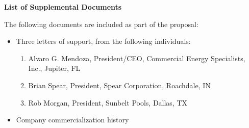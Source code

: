 \documentclass[11pt]{article}
\begin{document}
\pagestyle{empty}
\thispagestyle{empty}

\begin{center}
\textbf{\Large List of Supplemental Documents}
\end{center}

The following documents are included as part of the proposal:

\begin{itemize}

\item Three letters of support, from the following individuals:

\begin{enumerate}

\item Alvaro G. Mendoza, President/CEO, Commercial Energy
Specialists, Inc., Jupiter, FL

\item Brian Spear, President, Spear Corporation, Roachdale, IN

\item Rob Morgan, President, Sunbelt Pools, Dallas, TX

\end{enumerate}

\item Company commercialization history

\end{itemize}
\end{document}
